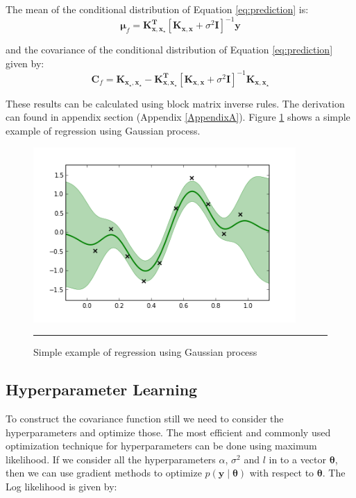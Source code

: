 The mean of the conditional distribution of Equation \ref{eq:prediction} is:
\begin{equation} \label{eq:prediction_mean}
  \boldsymbol{\mu}_f = \mathbf{K_{x,x_\star}^T} \left[ \mathbf{K_{x,x}}+ \sigma^2\mathbf{I} \right]^{-1} \mathbf{y}
\end{equation}

and the covariance of the conditional distribution of Equation \ref{eq:prediction} given by:
\begin{equation} \label{eq:prediction_cov}
  \mathbf{C}_f = \mathbf{K_{x_\star,x_\star}} -
		\mathbf{K_{x,x_\star}^T} \left[ \mathbf{K_{x,x}}+ \sigma^2\mathbf{I} \right]^{-1} \mathbf{K_{x,x_\star}}
\end{equation}

These results can be calculated using block matrix inverse rules. The derivation can found 
in appendix section (Appendix \ref{AppendixA}). Figure \ref{fig:dempGPReg} shows a simple example of regression
using Gaussian process.

\begin{figure}[t]
	\centering
		\includegraphics[width=10cm,keepaspectratio]{diagrams/demoGPReg.png}
		\rule{35em}{0.5pt}
	\caption[Simple example of regression using Gaussian process]
		{Simple example of regression using Gaussian process}
	\label{fig:dempGPReg}
\end{figure}

\subsection{Hyperparameter Learning}
To construct the covariance function
still we need to consider the hyperparameters and optimize those. The most efficient and commonly used 
optimization technique for hyperparameters can be done using maximum likelihood. If we consider all the hyperparameters
$\alpha$, $\sigma^2$ and $l$ in to a vector $\boldsymbol{\theta}$, then we can use gradient methods to optimize
$p \left(\mathbf{y}\middle|\boldsymbol{\theta}\right)$ with respect to $\boldsymbol{\theta}$. The Log
likelihood is given by:

